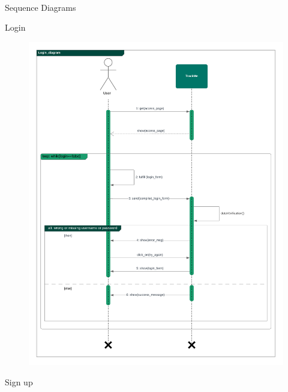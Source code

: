 \documentclass{article}
\begin{document}
\begin{legal}
\begin{legal}
\begin{legal}
\begin{tabular}{| m{3.5cm} | m{8cm}| }
				\hline
				\end{tabular}
				\\\\\\
			\item Sequence Diagrams
			\begin{legal}
			\item Login
				\begin{figure}[H]
  				\includegraphics[width=\linewidth]{./images/seq-diagrams/Login_diagram.png}
				\end{figure}
			\item Sign up
				\begin{figure}[H]

\end{figure}
\end{legal}
\end{legal}
\end{legal}
\end{legal}
\end{document}
